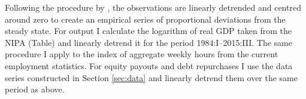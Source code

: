 Following the procedure by \citeauthor{JERMANNfinancial}, the observations are linearly detrended and centred around zero to create an empirical series of proportional deviations from the steady state. For output I calculate the logarithm of real GDP taken from the NIPA (Table) and linearly detrend it for the period 1984:I--2015:III. The same procedure I apply to the index of aggregate weekly hours from the current employment statistics. For equity payouts and debt repurchases I use the data series constructed in Section \ref{sec:data} and linearly detrend them over the same period as above.
